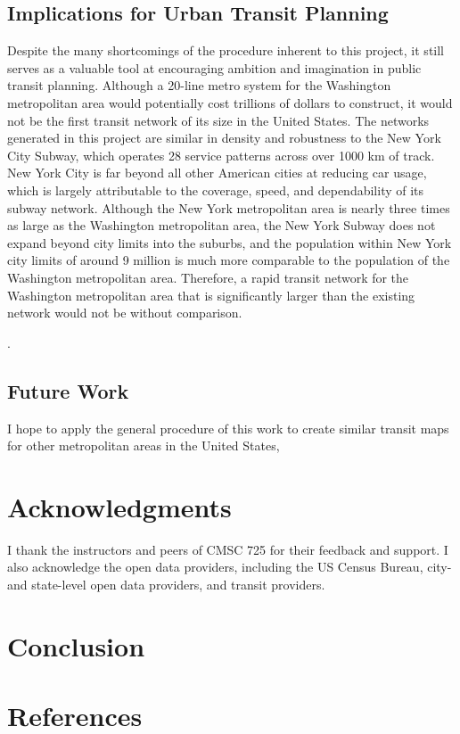 \documentclass[manuscript]{acmart}
\begin{document}
\subsection{Implications for Urban Transit Planning}
Despite the many shortcomings of the procedure inherent to this project, it still serves as a valuable tool at encouraging ambition and imagination in public transit planning. Although a 20-line metro system for the Washington metropolitan area would potentially cost trillions of dollars to construct, it would not be the first transit network of its size in the United States. The networks generated in this project are similar in density and robustness to the New York City Subway, which operates 28 service patterns across over 1000 km of track. New York City is far beyond all other American cities at reducing car usage, which is largely attributable to the coverage, speed, and dependability of its subway network. Although the New York metropolitan area is nearly three times as large as the Washington metropolitan area, the New York Subway does not expand beyond city limits into the suburbs, and the population within New York city limits of around 9 million is much more comparable to the population of the Washington metropolitan area. Therefore, a rapid transit network for the Washington metropolitan area that is significantly larger than the existing network would not be without comparison. 

\cite{bib:bast2016route, bib:chien2001genetic}.

\subsection{Future Work}

I hope to apply the general procedure of this work to create similar transit maps for other metropolitan areas in the United States, 


\section{Acknowledgments}

I thank the instructors and peers of CMSC 725 for their feedback and support. I also acknowledge the open data providers, including the US Census Bureau, city- and state-level open data providers, and transit providers.

\section{Conclusion}

\section{References}



\end{document}
